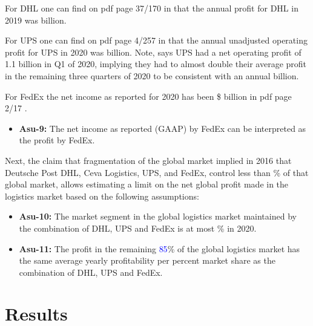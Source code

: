 For DHL one can find on pdf page 37/170 in \cite{dhl_2019_annual_report} that the annual profit for DHL in 2019 was \textcolor{purple}{\profitdhlbillion} billion.

For UPS one can find on pdf page 4/257 in \cite{ups_2020_annual_report} that the annual unadjusted operating profit for UPS in 2020 was \textcolor{purple}{\profitupsbillion} billion. Note, \cite{ups_q21_earnings_call} says UPS had a net operating profit of 1.1 billion in Q1 of 2020, implying they had to almost double their average profit in the remaining three quarters of 2020 to be consistent with an annual \textcolor{purple}{\profitupsbillion} billion.

For FedEx the net income as reported for 2020 has been \$\textcolor{purple}{\profitfedexbillion} billion in pdf page 2/17 \cite{fedex_2020_annual_report}.

\begin{itemize}
\item \textbf{Asu-9:} The net income as reported (GAAP) by FedEx can be interpreted as the profit by FedEx.
\end{itemize}

Next, the claim that fragmentation of the global market implied in 2016 that Deutsche Post DHL, Ceva Logistics, UPS, and FedEx, control less than \textcolor{purple}{\logisticsmarketsharedhlfedexupspercentage}\% of that global market, allows estimating a limit on the net global profit made in the logistics market based on the following assumptions:

\begin{itemize}
	\item \textbf{Asu-10:} The market segment in the global logistics market maintained by the combination of DHL, UPS and FedEx is at most \textcolor{purple}{\logisticsmarketsharedhlfedexupspercentage}\% in 2020.
	\item \textbf{Asu-11:} The profit in the remaining \textcolor{blue}{85}\% of the global logistics market has the same average yearly profitability per percent market share as the combination of DHL, UPS and FedEx.
\end{itemize}


\section{Results}
